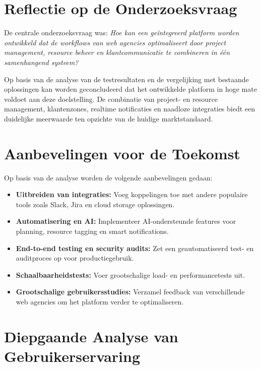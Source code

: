 \section{Reflectie op de Onderzoeksvraag}
\label{sec:reflectie-onderzoeksvraag}

De centrale onderzoeksvraag was: \emph{Hoe kan een geïntegreerd platform worden ontwikkeld dat de workflows van web agencies optimaliseert door project management, resource beheer en klantcommunicatie te combineren in één samenhangend systeem?}

Op basis van de analyse van de testresultaten en de vergelijking met bestaande oplossingen kan worden geconcludeerd dat het ontwikkelde platform in hoge mate voldoet aan deze doelstelling. De combinatie van project- en resource management, klantenzones, realtime notificaties en naadloze integraties biedt een duidelijke meerwaarde ten opzichte van de huidige marktstandaard.

\section{Aanbevelingen voor de Toekomst}
\label{sec:aanbevelingen}

Op basis van de analyse worden de volgende aanbevelingen gedaan:
\begin{itemize}
    \item \textbf{Uitbreiden van integraties:} Voeg koppelingen toe met andere populaire tools zoals Slack, Jira en cloud storage oplossingen.
    \item \textbf{Automatisering en AI:} Implementeer AI-ondersteunde features voor planning, resource tagging en smart notifications.
    \item \textbf{End-to-end testing en security audits:} Zet een geautomatiseerd test- en auditproces op voor productiegebruik.
    \item \textbf{Schaalbaarheidstests:} Voer grootschalige load- en performancetests uit.
    \item \textbf{Grootschalige gebruikersstudies:} Verzamel feedback van verschillende web agencies om het platform verder te optimaliseren.
\end{itemize}

\section{Diepgaande Analyse van Gebruikerservaring}
\label{sec:diepgaande-gebruikerservaring}

